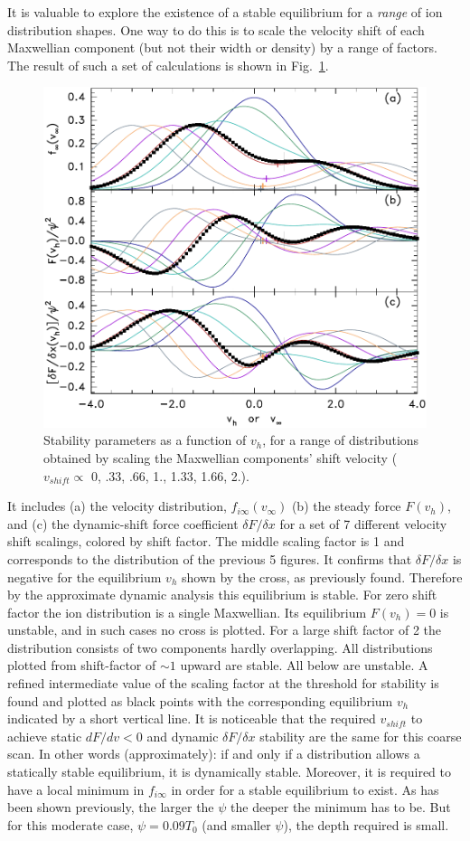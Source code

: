 \documentclass[pre]{revtex4-2}
\begin{document}
It is valuable to explore the existence of a stable equilibrium for a
\emph{range} of ion distribution shapes. One way to do this is to
scale the velocity shift of each Maxwellian component (but not their
width or density) by a range of factors. The result of such a set of
calculations is shown in Fig.\ \ref{fig:dynamic}.
\begin{figure}[htp]
  \centering
  \includegraphics[width=.6\hsize]{dynamic}
  \caption{Stability parameters as a function of $v_h$, for a range of
    distributions obtained by scaling the Maxwellian components' shift
    velocity ($v_{shift}\propto$ 0, .33, .66, 1., 1.33, 1.66, 2.).
    }
  \label{fig:dynamic}
\end{figure}
It includes (a) the velocity distribution, $f_{i\infty}(v_{\infty})$
(b) the steady force $F(v_h)$, and (c) the dynamic-shift force
coefficient $\delta F/\delta x$ for a set of 7 different velocity
shift scalings, colored by shift factor. The middle scaling factor is
1 and corresponds to the distribution of the previous 5
figures. It confirms that $\delta F/\delta x$ is negative for the
equilibrium $v_h$ shown by the cross, as previously found. Therefore
by the approximate dynamic analysis this equilibrium is stable. For
zero shift factor the ion distribution is a single
Maxwellian. Its equilibrium $F(v_h)=0$ is unstable, and in such cases
no cross is plotted. For a large shift factor of 2 the
distribution consists of two components hardly overlapping. All
distributions plotted from shift-factor of $\sim1$ upward are
stable. All below are unstable. A refined intermediate value of the
scaling factor at the threshold for stability is found and plotted as
black points with the corresponding equilibrium $v_h$ indicated by a
short vertical line.  It is noticeable that the required $v_{shift}$ to achieve
static $dF/dv<0$ and dynamic $\delta F/\delta x$ stability are the
same for this coarse scan. In other words (approximately): if and only
if a distribution allows a statically stable equilibrium, it is
dynamically stable. Moreover, it is required to have a local minimum
in $f_{i\infty}$ in order for a stable equilibrium to exist. As has
been shown previously\cite{Hutchinson2021c}, the larger the $\psi$ the
deeper the minimum has to be. But for this moderate case,
$\psi=0.09 T_0$ (and smaller $\psi$), the depth required is small.
\end{document}
